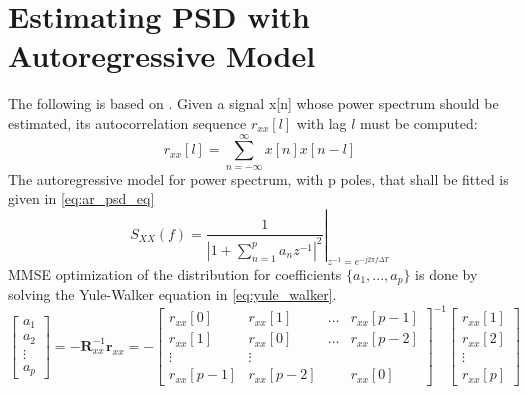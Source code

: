 	\appendix

	\section{Estimating PSD with Autoregressive Model}\label{yule_walker_ar_psd}
	The following is based on \cite{proakis_1993_psd}. Given a signal x[n] whose power spectrum should be estimated, its autocorrelation sequence $r_{xx}[l]$ with lag $l$ must be computed:
	\begin{equation}
		r_{xx}[l] = \sum_{n=-\infty}^{\infty} x[n]x[n-l]
	\end{equation}
	The autoregressive model for power spectrum, with p poles, that shall be fitted is given in \ref{eq:ar_psd_eq}
	\begin{equation}\label{eq:ar_psd_eq}
		S_{XX}(f) = \left.\frac{1}{|1+\sum_{n=1}^pa_nz^{-1}|^2}\right|_{z^{-1}=e^{-j2\pi f\Delta T}}
	\end{equation}
	MMSE optimization of the distribution for coefficients $\{a_1, ..., a_p\}$ is done by solving the Yule-Walker equation in \ref{eq:yule_walker}.
	\begin{equation} \label{eq:yule_walker}
	\begin{bmatrix}
	a_1\\ 
	a_2\\
	\vdots\\
	a_p
	\end{bmatrix} = 
	-\mathbf{R}_{xx}^{-1}\mathbf{r}_{xx}=
	-\begin{bmatrix}
	r_{xx}[0] & r_{xx}[1] & \dots & r_{xx}[p-1]\\ 
	r_{xx}[1] & r_{xx}[0] & \dots & r_{xx}[p-2]\\ 
	\vdots & \vdots &  & \\
	r_{xx}[p-1] & r_{xx}[p-2] &  & r_{xx}[0]
	\end{bmatrix}^{-1}
	\begin{bmatrix}
	r_{xx}[1]\\ 
	r_{xx}[2]\\
	\vdots\\
	r_{xx}[p]
	\end{bmatrix}
	\end{equation}

